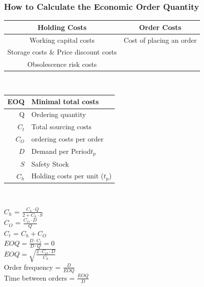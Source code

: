 \subsubsection{How to Calculate the Economic Order Quantity }\label{EOQ}
\begin{center}
\begin{tabular}{|c|c|}
	\hline Holding Costs  & Order Costs \\ 
	\hline Working capital costs & Cost of placing an order \\
	Storage costs \& Price discount costs\\
	Obsolescence risk costs & \\
	\hline
\end{tabular}
\\\vspace{5 mm}
	\begin{tabular}{|r|l|}
		\hline EOQ  & Minimal total costs \\ 
		\hline Q  & Ordering quantity \\ 
		\hline $C_t$ & Total sourcing costs \\ 
		\hline $C_O$ & ordering costs per order\\ 
		\hline $D$ & Demand per Period$t_p$\\
		\hline $S$ & Safety Stock\\
		\hline $C_h$& Holding costs per unit ($t_p$)\\
		\hline
	\end{tabular}
	\\\vspace{5 mm}
	
	$C_h$ = $\frac{C_h\cdot Q}{2 + C_h \cdot S}$\\\vspace{2mm}
	$C_O$ = $\frac{C_O \cdot D}{Q}$\\\vspace{2mm}
	$C_t$ =  $C_h + C_O$\\\vspace{2mm}
	$EOQ = \frac{D \cdot C_t}{D \cdot Q} = 0$ \\\vspace{2 mm}
	$EOQ = \sqrt{\frac{2 \cdot C_O \cdot D}{C_h}}$ \\\vspace{2 mm}
	Order frequency = $\frac{D}{EOQ}$\\\vspace{2mm}
	Time between orders = $\frac{EOQ}{D}$\\\vspace{2mm}
	
\end{center}
